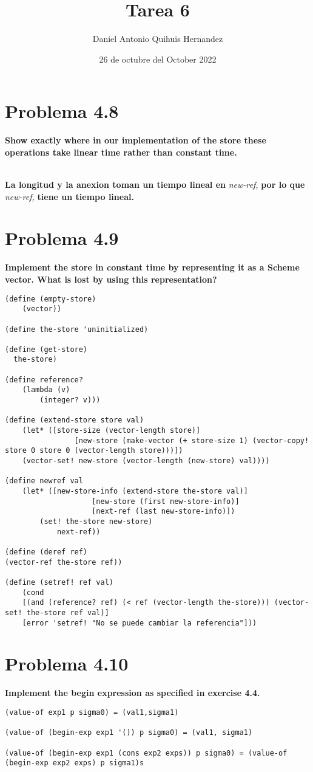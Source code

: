 \documentclass{article}
\title{Tarea 6}
\author{Daniel Antonio Quihuis Hernandez }
\date{26 de octubre del October 2022}
\begin{document}
\maketitle

\section{Problema 4.8}
\textbf{Show exactly where in our implementation of the store these operations take linear time rather than constant time.} 

\textbf{\\La longitud y la anexion toman un tiempo lineal en}
\textit{new-ref, }
\textbf{por lo que}
\textit{new-ref, }
\textbf{tiene un tiempo lineal.}

\section{Problema 4.9}
\textbf{Implement the store in constant time by representing it as a Scheme
vector. What is lost by using this representation?}
\begin{lstlisting}
(define (empty-store)
	(vector))

(define the-store 'uninitialized)

(define (get-store)
  the-store)

(define reference?
	(lambda (v)
		(integer? v)))

(define (extend-store store val)
	(let* ([store-size (vector-length store)]
				[new-store (make-vector (+ store-size 1) (vector-copy! store 0 store 0 (vector-length store)))])
	(vector-set! new-store (vector-length (new-store) val))))

(define newref val
	(let* ([new-store-info (extend-store the-store val)]
					[new-store (first new-store-info)]
					[next-ref (last new-store-info)])
		(set! the-store new-store) 
			next-ref))

(define (deref ref)
(vector-ref the-store ref))

(define (setref! ref val)
	(cond
	[(and (reference? ref) (< ref (vector-length the-store))) (vector-set! the-store ref val)]
	[error 'setref! "No se puede cambiar la referencia"]))
\end{lstlisting}

\section{Problema 4.10}
\textbf{Implement the begin expression as specified in exercise 4.4.}
\begin{lstlisting}
(value-of exp1 p sigma0) = (val1,sigma1)

(value-of (begin-exp exp1 '()) p sigma0) = (val1, sigma1)

(value-of (begin-exp exp1 (cons exp2 exps)) p sigma0) = (value-of (begin-exp exp2 exps) p sigma1)s
\end{lstlisting}
\end{document}
